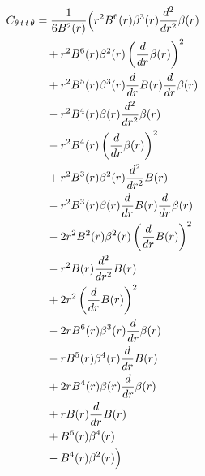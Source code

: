 \documentclass[11pt,a4paper]{article}
\begin{document}
\begin{align*}
  C_{\theta\,t\,t\,\theta} &= \frac{1}{6 B^{2}{\left(r \right)}}\Bigl(r^{2} B^{6}{\left(r \right)} \beta^{3}{\left(r \right)} \frac{d^{2}}{d r^{2}} \beta{\left(r \right)} \\
  &\quad + r^{2} B^{6}{\left(r \right)} \beta^{2}{\left(r \right)} \left(\frac{d}{d r} \beta{\left(r \right)}\right)^{2} \\
  &\quad + r^{2} B^{5}{\left(r \right)} \beta^{3}{\left(r \right)} \frac{d}{d r} B{\left(r \right)} \frac{d}{d r} \beta{\left(r \right)} \\
  &\quad - r^{2} B^{4}{\left(r \right)} \beta{\left(r \right)} \frac{d^{2}}{d r^{2}} \beta{\left(r \right)} \\
  &\quad - r^{2} B^{4}{\left(r \right)} \left(\frac{d}{d r} \beta{\left(r \right)}\right)^{2} \\
  &\quad + r^{2} B^{3}{\left(r \right)} \beta^{2}{\left(r \right)} \frac{d^{2}}{d r^{2}} B{\left(r \right)} \\
  &\quad - r^{2} B^{3}{\left(r \right)} \beta{\left(r \right)} \frac{d}{d r} B{\left(r \right)} \frac{d}{d r} \beta{\left(r \right)} \\
  &\quad - 2 r^{2} B^{2}{\left(r \right)} \beta^{2}{\left(r \right)} \left(\frac{d}{d r} B{\left(r \right)}\right)^{2} \\
  &\quad - r^{2} B{\left(r \right)} \frac{d^{2}}{d r^{2}} B{\left(r \right)} \\
  &\quad + 2 r^{2} \left(\frac{d}{d r} B{\left(r \right)}\right)^{2} \\
  &\quad - 2 r B^{6}{\left(r \right)} \beta^{3}{\left(r \right)} \frac{d}{d r} \beta{\left(r \right)} \\
  &\quad - r B^{5}{\left(r \right)} \beta^{4}{\left(r \right)} \frac{d}{d r} B{\left(r \right)} \\
  &\quad + 2 r B^{4}{\left(r \right)} \beta{\left(r \right)} \frac{d}{d r} \beta{\left(r \right)} \\
  &\quad + r B{\left(r \right)} \frac{d}{d r} B{\left(r \right)} \\
  &\quad + B^{6}{\left(r \right)} \beta^{4}{\left(r \right)} \\
  &\quad - B^{4}{\left(r \right)} \beta^{2}{\left(r \right)}\Bigr)
\end{align*}
\end{document}
